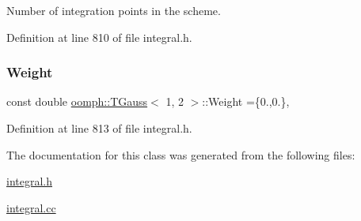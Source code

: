 Number of integration points in the scheme. 



Definition at line 810 of file integral.\+h.

\mbox{\label{classoomph_1_1TGauss_3_011_00_012_01_4_a8445706d073b901d94dd558b0e838944}} 
\subsubsection{\texorpdfstring{Weight}{Weight}}
{\footnotesize\ttfamily const double \hyperlink{classoomph_1_1TGauss}{oomph\+::\+T\+Gauss}$<$ 1, 2 $>$\+::Weight =\{0.,0.\}\hspace{0.3cm}{\ttfamily [static]}, {\ttfamily [private]}}



Definition at line 813 of file integral.\+h.



The documentation for this class was generated from the following files\+:\begin{DoxyCompactItemize}
\item 
\hyperlink{integral_8h}{integral.\+h}\item 
\hyperlink{integral_8cc}{integral.\+cc}\end{DoxyCompactItemize}
